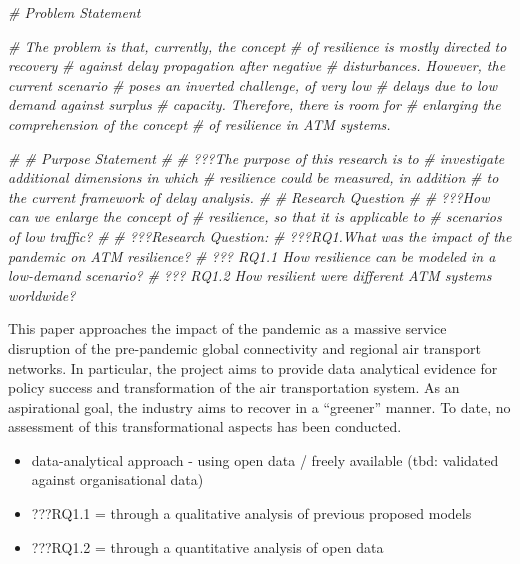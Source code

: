 \documentclass[conference,final,]{IEEEtran}
\newenvironment{Shaded}{\begin{snugshade}}{\end{snugshade}}
\newcommand{\CommentTok}[1]{\textcolor[rgb]{0.56,0.35,0.01}{\textit{#1}}}
\providecommand{\tightlist}{%
  \setlength{\itemsep}{0pt}\setlength{\parskip}{0pt}}
\begin{document}
\begin{Shaded}
\begin{Highlighting}[]
\CommentTok{\# Problem Statement }

\CommentTok{\# The problem is that, currently, the concept}
\CommentTok{\# of resilience is mostly directed to recovery}
\CommentTok{\# against delay propagation after negative }
\CommentTok{\# disturbances. However, the current scenario}
\CommentTok{\# poses an inverted challenge, of very low }
\CommentTok{\# delays due to low demand against surplus }
\CommentTok{\# capacity. Therefore, there is room for }
\CommentTok{\# enlarging the comprehension of the concept}
\CommentTok{\# of resilience in ATM systems. }

\CommentTok{\# \# Purpose Statement}
\CommentTok{\# }
\CommentTok{\# ???The purpose of this research is to }
\CommentTok{\# investigate additional dimensions in which }
\CommentTok{\# resilience could be measured, in addition}
\CommentTok{\# to the current framework of delay analysis.}
\CommentTok{\# }
\CommentTok{\# Research Question}
\CommentTok{\# }
\CommentTok{\# ???How can we enlarge the concept of }
\CommentTok{\# resilience, so that it is applicable to}
\CommentTok{\# scenarios of low traffic? }
\CommentTok{\#}
\CommentTok{\# ???Research Question: }
\CommentTok{\# ???RQ1.What was the impact of the pandemic on ATM resilience?}
\CommentTok{\# ???  RQ1.1 How resilience can be modeled in a low{-}demand scenario?}
\CommentTok{\# ???  RQ1.2 How resilient were different ATM systems worldwide?}
\end{Highlighting}
\end{Shaded}

This paper approaches the impact of the pandemic as a massive service disruption of the pre-pandemic global connectivity and regional air transport networks. In particular, the project aims to provide data analytical evidence for policy success and transformation of the air transportation system. As an aspirational goal, the industry aims to recover in a ``greener'' manner. To date, no assessment of this transformational aspects has been conducted.

\begin{itemize}
\tightlist
\item
  data-analytical approach - using open data / freely available (tbd: validated against organisational data)
\item
  ???RQ1.1 = through a qualitative analysis of previous proposed models
\item
  ???RQ1.2 = through a quantitative analysis of open data
\end{itemize}
\end{document}
